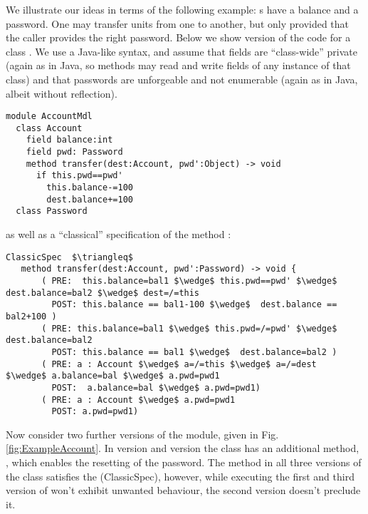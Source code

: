 



We illustrate our ideas in terms of the following example:
s have a balance and a password. One may transfer
 units from one  to another, but only provided
that the caller provides the right password. Below we show version
 of the code for a class .  We use a Java-like
syntax, and assume that fields are ``class-wide'' private (again as in
Java, so methods may read and write fields of any instance of that
class) and that passwords are unforgeable and not enumerable (again as
in Java, albeit without reflection).

 
\begin{lstlisting}[language=Chainmail]
module AccountMdl
  class Account
    field balance:int 
    field pwd: Password
    method transfer(dest:Account, pwd':Object) -> void
      if this.pwd==pwd'
        this.balance-=100
        dest.balance+=100
  class Password
\end{lstlisting}

as well as a ``classical'' specification of the method :



\begin{lstlisting}[mathescape=true, frame=lines, language=Chainmail]
ClassicSpec  $\triangleq$
   method transfer(dest:Account, pwd':Password) -> void {
       ( PRE:  this.balance=bal1 $\wedge$ this.pwd==pwd' $\wedge$ dest.balance=bal2 $\wedge$ dest=/=this 
         POST: this.balance == bal1-100 $\wedge$  dest.balance == bal2+100 )
       ( PRE: this.balance=bal1 $\wedge$ this.pwd=/=pwd' $\wedge$ dest.balance=bal2
         POST: this.balance == bal1 $\wedge$  dest.balance=bal2 )
       ( PRE: a : Account $\wedge$ a=/=this $\wedge$ a=/=dest  $\wedge$ a.balance=bal $\wedge$ a.pwd=pwd1
         POST:  a.balance=bal $\wedge$ a.pwd=pwd1)
       ( PRE: a : Account $\wedge$ a.pwd=pwd1  
         POST: a.pwd=pwd1)       
\end{lstlisting}
 
  
 
 Now consider two further versions of the module, given in Fig. \ref{fig:ExampleAccount}.
 In version {} and version {} the  class has an additional method, , which enables the resetting of the password.
The method  in all three versions of the class  satisfies the (ClassicSpec), 
however, while executing the first and third version of  won't exhibit unwanted behaviour, the second version doesn't preclude it.
  

